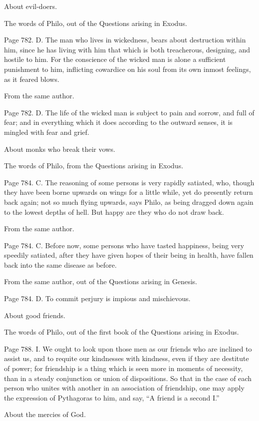 About evil-doers.

The words of Philo, out of the Questions arising in Exodus.

Page 782. D. The man who lives in wickedness, bears about destruction within him, since he has
living with him that which is both treacherous, designing, and hostile to him. For the conscience of
the wicked man is alone a sufficient punishment to him, inflicting cowardice on his soul from its own
inmost feelings, as it feared blows.

From the same author.

Page 782. D. The life of the wicked man is subject to pain and sorrow, and full of fear; and in
everything which it does according to the outward senses, it is mingled with fear and grief.

About monks who break their vows.

The words of Philo, from the Questions arising in Exodus.

Page 784. C. The reasoning of some persons is very rapidly satiated, who, though they have been
borne upwards on wings for a little while, yet do presently return back again; not so much flying
upwards, says Philo, as being dragged down again to the lowest depths of hell. But happy are they
who do not draw back.

From the same author.

Page 784. C. Before now, some persons who have tasted happiness, being very speedily satiated,
after they have given hopes of their being in health, have fallen back into the same disease as
before.

From the same author, out of the Questions arising in Genesis.

Page 784. D. To commit perjury is impious and mischievous.

About good friends.

The words of Philo, out of the first book of the Questions arising in Exodus.

Page 788. I. We ought to look upon those men as our friends who are inclined to assist us, and to
requite our kindnesses with kindness, even if they are destitute of power; for friendship is a thing
which is seen more in moments of necessity, than in a steady conjunction or union of dispositions.
So that in the case of each person who unites with another in an association of friendship, one
may apply the expression of Pythagoras to him, and say, ``A friend is a second I.''

About the mercies of God.

